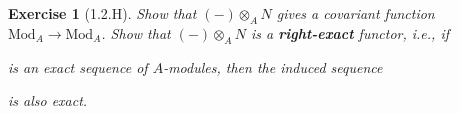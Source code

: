 \documentclass{amsart}
\newtheorem*{exercise*}{Exercise}
\begin{document}
\vspace{0.1in}


\begin{exercise*}[1.2.H]
    Show that $(-)\otimes_AN$ gives a covariant function $\mathrm{Mod}_A\rightarrow\mathrm{Mod}_A$. Show that $(-)\otimes_AN$ is a \textbf{right-exact} functor, i.e., if
    \begin{center}
    \end{center}
    is an exact sequence of $A$-modules, then the induced sequence
    \begin{center}
    \end{center}
    is also exact.
\end{exercise*}

\vspace{0.1in}
\end{document}
